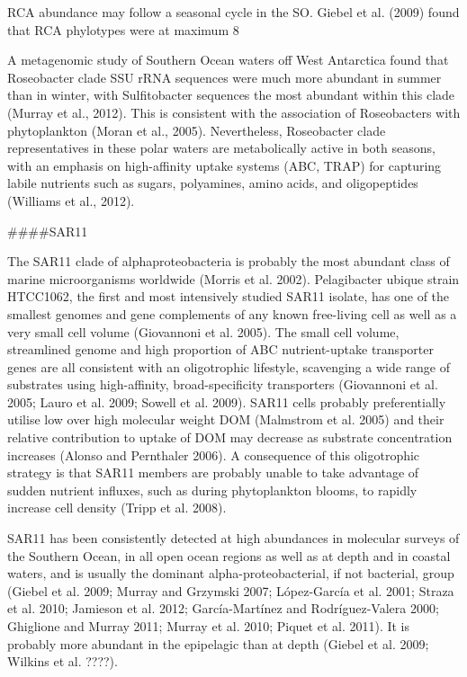 RCA abundance may follow a seasonal cycle in the SO. Giebel et al. (2009) found that RCA phylotypes were at maximum 8%

A metagenomic study of Southern Ocean waters off West Antarctica found that Roseobacter clade SSU rRNA sequences were much more abundant in summer than in winter, with Sulfitobacter sequences the most abundant within this clade (Murray et al., 2012). This is consistent with the association of Roseobacters with phytoplankton (Moran et al., 2005). Nevertheless, Roseobacter clade representatives in these polar waters are metabolically active in both seasons, with an emphasis on high-affinity uptake systems (ABC, TRAP) for capturing labile nutrients such as sugars, polyamines, amino acids, and oligopeptides (Williams et al., 2012).


####SAR11

The SAR11 clade of alphaproteobacteria is probably the most abundant class of marine microorganisms worldwide (Morris et al. 2002). Pelagibacter ubique strain HTCC1062, the first and most intensively studied SAR11 isolate, has one of the smallest genomes and gene complements of any known free-living cell as well as a very small cell volume (Giovannoni et al. 2005). The small cell volume, streamlined genome and high proportion of ABC nutrient-uptake transporter genes are all consistent with an oligotrophic lifestyle, scavenging a wide range of substrates using high-affinity, broad-specificity transporters (Giovannoni et al. 2005; Lauro et al. 2009; Sowell et al. 2009). SAR11 cells probably preferentially utilise low over high molecular weight DOM (Malmstrom et al. 2005) and their relative contribution to uptake of DOM may decrease as substrate concentration increases (Alonso and Pernthaler 2006). A consequence of this oligotrophic strategy is that SAR11 members are probably unable to take advantage of sudden nutrient influxes, such as during phytoplankton blooms, to rapidly increase cell density (Tripp et al. 2008).

SAR11 has been consistently detected at high abundances in molecular surveys of the Southern Ocean, in all open ocean regions as well as at depth and in coastal waters, and is usually the dominant alpha-proteobacterial, if not bacterial, group (Giebel et al. 2009; Murray and Grzymski 2007; López-García et al. 2001; Straza et al. 2010; Jamieson et al. 2012; García-Martínez and Rodríguez-Valera 2000; Ghiglione and Murray 2011; Murray et al. 2010; Piquet et al. 2011). It is probably more abundant in the epipelagic than at depth (Giebel et al. 2009; Wilkins et al. ????).

